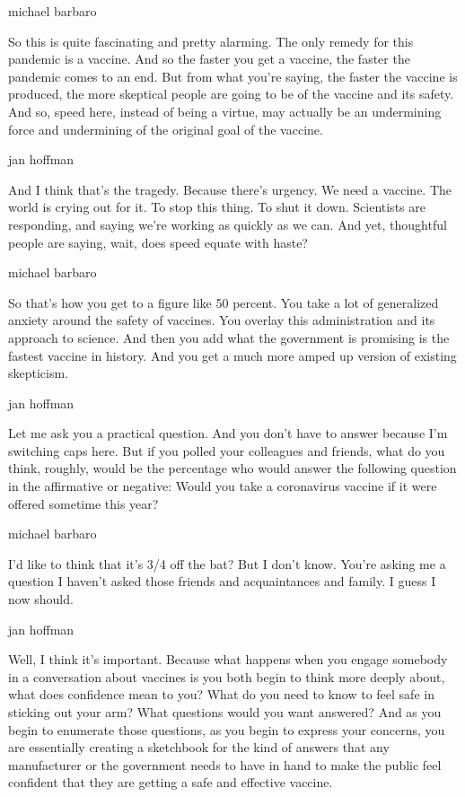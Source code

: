 michael barbaro

So this is quite fascinating and pretty alarming. The only remedy for
this pandemic is a vaccine. And so the faster you get a vaccine, the
faster the pandemic comes to an end. But from what you're saying, the
faster the vaccine is produced, the more skeptical people are going to
be of the vaccine and its safety. And so, speed here, instead of being a
virtue, may actually be an undermining force and undermining of the
original goal of the vaccine.

jan hoffman

And I think that's the tragedy. Because there's urgency. We need a
vaccine. The world is crying out for it. To stop this thing. To shut it
down. Scientists are responding, and saying we're working as quickly as
we can. And yet, thoughtful people are saying, wait, does speed equate
with haste?

michael barbaro

So that's how you get to a figure like 50 percent. You take a lot of
generalized anxiety around the safety of vaccines. You overlay this
administration and its approach to science. And then you add what the
government is promising is the fastest vaccine in history. And you get a
much more amped up version of existing skepticism.

jan hoffman

Let me ask you a practical question. And you don't have to answer
because I'm switching caps here. But if you polled your colleagues and
friends, what do you think, roughly, would be the percentage who would
answer the following question in the affirmative or negative: Would you
take a coronavirus vaccine if it were offered sometime this year?

michael barbaro

I'd like to think that it's 3/4 off the bat? But I don't know. You're
asking me a question I haven't asked those friends and acquaintances and
family. I guess I now should.

jan hoffman

Well, I think it's important. Because what happens when you engage
somebody in a conversation about vaccines is you both begin to think
more deeply about, what does confidence mean to you? What do you need to
know to feel safe in sticking out your arm? What questions would you
want answered? And as you begin to enumerate those questions, as you
begin to express your concerns, you are essentially creating a
sketchbook for the kind of answers that any manufacturer or the
government needs to have in hand to make the public feel confident that
they are getting a safe and effective vaccine.

